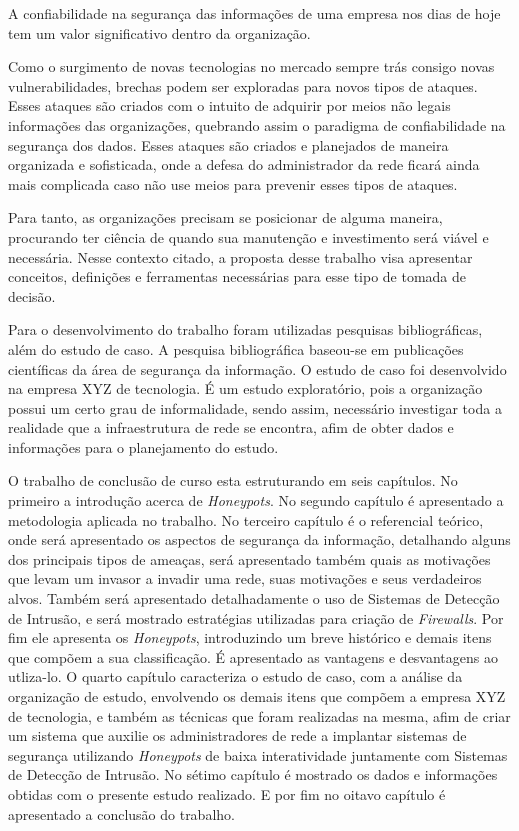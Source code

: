 A confiabilidade na segurança das informações de uma empresa nos dias de hoje tem um valor significativo dentro da organização. 

Como o surgimento de novas tecnologias no mercado sempre trás consigo novas vulnerabilidades, brechas podem ser exploradas para novos tipos de ataques. Esses ataques são criados com o intuito de adquirir por meios não legais informações das organizações, quebrando assim o paradigma de confiabilidade na segurança dos dados. Esses ataques são criados e planejados de maneira organizada e sofisticada, onde a defesa do administrador da rede ficará ainda mais complicada caso não use meios para prevenir esses tipos de ataques.

Para tanto, as organizações precisam se posicionar de alguma maneira, procurando ter ciência de quando sua manutenção e investimento será viável e necessária. Nesse contexto citado, a proposta desse trabalho visa apresentar conceitos, definições e ferramentas necessárias para esse tipo de tomada de decisão.

Para o desenvolvimento do trabalho foram utilizadas pesquisas bibliográficas, além do estudo de caso. A pesquisa bibliográfica baseou-se em publicações científicas da área de segurança da informação. O estudo de caso foi desenvolvido na empresa XYZ de tecnologia. É um estudo exploratório, pois a organização possui um certo grau de informalidade, sendo assim, necessário investigar toda a realidade que a infraestrutura de rede se encontra, afim de obter dados e informações para o planejamento do estudo.

O trabalho de conclusão de curso esta estruturando em seis capítulos. No primeiro a introdução acerca de \textit{Honeypots}. No segundo capítulo é apresentado a metodologia aplicada no trabalho. No terceiro capítulo é o referencial teórico, onde será apresentado os aspectos de segurança da informação, detalhando alguns dos principais tipos de ameaças, será apresentado também quais as motivações que levam um invasor a invadir uma rede, suas motivações e seus verdadeiros alvos. Também será apresentado detalhadamente o uso de Sistemas de Detecção de Intrusão, e será mostrado estratégias utilizadas para criação de \textit{Firewalls}. Por fim ele apresenta os \textit{Honeypots}, introduzindo um breve histórico e demais itens que compõem a sua classificação. É apresentado as vantagens e desvantagens ao utliza-lo. O quarto capítulo caracteriza o estudo de caso, com a análise da organização de estudo, envolvendo os demais itens que compõem a empresa XYZ de tecnologia, e também as técnicas que foram realizadas na mesma, afim de criar um sistema que auxilie os administradores de rede a implantar sistemas de segurança utilizando \textit{Honeypots} de baixa interatividade juntamente com Sistemas de Detecção de Intrusão. No sétimo capítulo é mostrado os dados e informações obtidas com o presente estudo realizado. E por fim no oitavo capítulo é apresentado a conclusão do trabalho.

